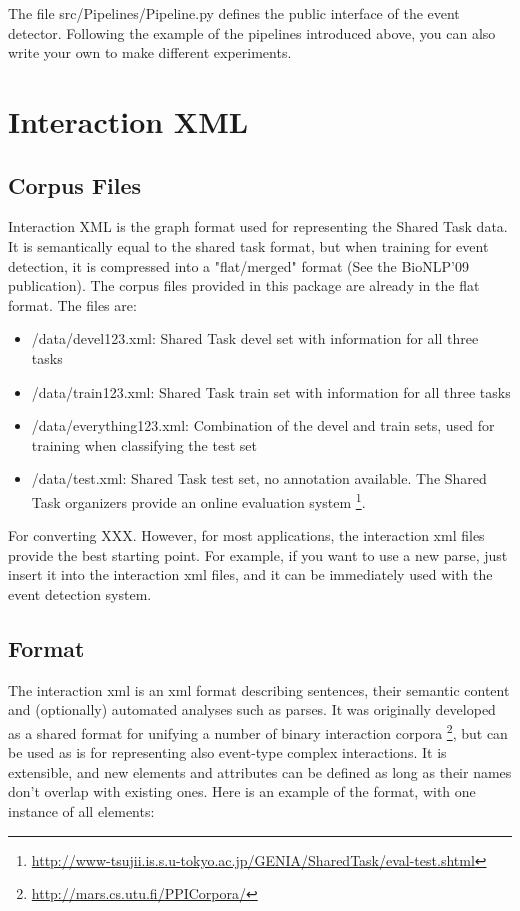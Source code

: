 \documentclass[a4paper,12pt]{article}
\begin{document}
The file src/Pipelines/Pipeline.py defines the public interface of the event
detector. Following the example of the pipelines introduced above, you can
also write your own to make different experiments.

\section{Interaction XML}

\subsection{Corpus Files}

Interaction XML is the graph format used for representing the Shared Task data.
It is semantically equal to the shared task format, but when training for event
detection, it is compressed into a "flat/merged" format (See the BioNLP'09
publication). The corpus files provided in this package are already in the flat
format. The files are:

\begin{itemize}
\item /data/devel123.xml: Shared Task devel set with information for all three tasks

\item /data/train123.xml: Shared Task train set with information for all three
tasks 

\item /data/everything123.xml: Combination of the devel and train sets, used
for training when classifying the test set

\item /data/test.xml: Shared Task test set, no annotation available. The Shared
Task organizers provide an online evaluation system
\footnote{\url{http://www-tsujii.is.s.u-tokyo.ac.jp/GENIA/SharedTask/eval-test.shtml}}.

\end{itemize}

For converting XXX.
However, for most applications, the interaction xml files provide the best
starting point. For example, if you want to use a new parse, just insert it into
the interaction xml files, and it can be immediately used with the event
detection system.

\subsection{Format}

The interaction xml is an xml format describing sentences, their semantic content
and (optionally) automated analyses such as parses. It was originally
developed as a shared format for unifying a number of binary interaction corpora
\footnote{\url{http://mars.cs.utu.fi/PPICorpora/}}, but can be used as is for
representing also event-type complex interactions. It is extensible, and new
elements and attributes can be defined as long as their names don't overlap with existing
ones. Here is an example of the format, with one instance of all elements:
\end{document}
